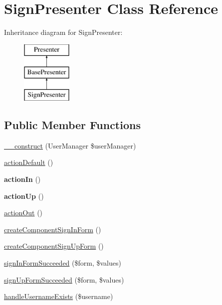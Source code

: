 \hypertarget{class_app_1_1_presenters_1_1_sign_presenter}{}\section{Sign\+Presenter Class Reference}
\label{class_app_1_1_presenters_1_1_sign_presenter}
Inheritance diagram for Sign\+Presenter\+:\begin{figure}[H]
\begin{center}
\leavevmode
\includegraphics[height=3.000000cm]{class_app_1_1_presenters_1_1_sign_presenter}
\end{center}
\end{figure}
\subsection*{Public Member Functions}
\begin{DoxyCompactItemize}
\item 
\mbox{\hyperlink{class_app_1_1_presenters_1_1_sign_presenter_a29d4b5fe645c2cef5f995a35d823029f}{\+\_\+\+\_\+construct}} (User\+Manager \$user\+Manager)
\item 
\mbox{\hyperlink{class_app_1_1_presenters_1_1_sign_presenter_ab3af58fdd7adf8de36403909fa255979}{action\+Default}} ()
\item 
\mbox{\label{class_app_1_1_presenters_1_1_sign_presenter_aa330fd9f860dd2ea8be435eb69e706bb}} 
{\bfseries action\+In} ()
\item 
\mbox{\label{class_app_1_1_presenters_1_1_sign_presenter_a82c9b4a056d9e439f41b5e3b9bd3b286}} 
{\bfseries action\+Up} ()
\item 
\mbox{\hyperlink{class_app_1_1_presenters_1_1_sign_presenter_aa8143a70f2cd43780e9a2ec146b6b7c9}{action\+Out}} ()
\item 
\mbox{\hyperlink{class_app_1_1_presenters_1_1_sign_presenter_a3c4ccf80318992a3c1ec5e30784d1b14}{create\+Component\+Sign\+In\+Form}} ()
\item 
\mbox{\hyperlink{class_app_1_1_presenters_1_1_sign_presenter_aca5b70d50f918f3944592a75fbe4b365}{create\+Component\+Sign\+Up\+Form}} ()
\item 
\mbox{\hyperlink{class_app_1_1_presenters_1_1_sign_presenter_ab125eb8fde8a0bb557f930e1bbf348d3}{sign\+In\+Form\+Succeeded}} (\$form, \$values)
\item 
\mbox{\hyperlink{class_app_1_1_presenters_1_1_sign_presenter_a0703a42cc6f7183e60d908e4e52cb6df}{sign\+Up\+Form\+Succeeded}} (\$form, \$values)
\item 
\mbox{\hyperlink{class_app_1_1_presenters_1_1_sign_presenter_aab0bff536238b6c628a58419d1d94d5d}{handle\+Username\+Exists}} (\$username)
\end{DoxyCompactItemize}
